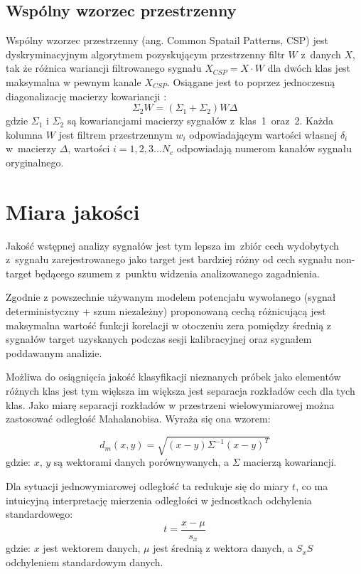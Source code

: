 \documentclass[licencjacka,openright]{pracamgr}
\begin{document}
\subsection{Wspólny wzorzec przestrzenny}
Wspólny wzorzec przestrzenny (ang. Common Spatail Patterns, CSP) \citep{koles1990} jest dyskryminacyjnym algorytmem pozyskującym przestrzenny filtr $W$ z~danych $X$, tak że różnica wariancji filtrowanego sygnału \mbox{$X_{CSP} = X \cdot W$} dla dwóch klas jest maksymalna w pewnym kanale $X_{CSP}$. Osiągane jest to poprzez jednoczesną diagonalizację macierzy kowariancji \citep{samsek2012}:
\begin{equation}
\Sigma _2 W = (\Sigma _1 + \Sigma _2 )W \Delta
\end{equation}
gdzie $\Sigma_1$ i $\Sigma_2$ są kowariancjami macierzy sygnałów z~klas~1~oraz~2. Każda kolumna $W$ jest filtrem przestrzennym $w_i$ odpowiadającym wartości własnej $\delta _i$ w~macierzy $\Delta$, wartości $i = 1,2,3 \ldots N_c$ odpowiadają numerom kanałów sygnału oryginalnego.

\section{Miara jakości}
\label{miara}
Jakość wstępnej analizy sygnałów jest tym lepsza im~zbiór cech wydobytych z~sygnału zarejestrowanego jako target jest bardziej różny od cech sygnału non-target będącego szumem z~punktu widzenia analizowanego zagadnienia.

Zgodnie z powszechnie używanym modelem potencjału wywołanego (sygnał deterministyczny + szum niezależny) proponowaną cechą  różnicującą jest maksymalna wartość funkcji korelacji w otoczeniu zera pomiędzy średnią z sygnałów target uzyskanych podczas sesji kalibracyjnej oraz sygnałem poddawanym analizie.

Możliwa do osiągnięcia jakość klasyfikacji nieznanych próbek jako elementów różnych klas jest tym większa im większa jest separacja rozkładów cech dla tych klas. Jako miarę separacji rozkładów w przestrzeni wielowymiarowej można zastosować odległość Mahalanobisa. Wyraża się ona wzorem:

\begin{equation}
d_{m}{(x,y)}=\sqrt{(x-y)\Sigma^{-1}(x-y)^T}
\end{equation}
gdzie: $x$, $y$ są wektorami danych porównywanych, a $\Sigma$ macierzą kowariancji.

Dla sytuacji jednowymiarowej odległość ta redukuje się do miary $t$, co ma intuicyjną interpretację mierzenia odległości w jednostkach odchylenia standardowego:
\begin{equation}
t = \frac{x-\mu}{s_x}
\end{equation}
gdzie: $x$ jest wektorem danych, $\mu$ jest średnią z wektora danych, a $S_xS$ odchyleniem standardowym danych.
\end{document}
